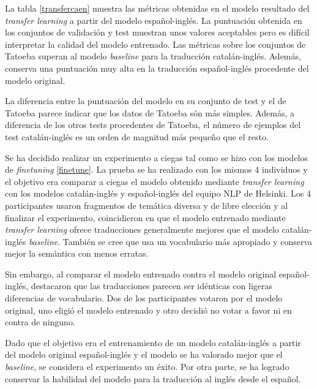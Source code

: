 La tabla \ref{transfercaen} muestra las métricas obtenidas en el modelo resultado del \textit{transfer learning} a partir del modelo español-inglés. La puntuación obtenida en los conjuntos de validación y test muestran unos valores aceptables pero es difícil interpretar la calidad del modelo entrenado. Las métricas sobre los conjuntos de Tatoeba superan al modelo \textit{baseline} para la traducción catalán-inglés. Además, conserva una puntuación muy alta en la traducción español-inglés procedente del modelo original.

La diferencia entre la puntuación del modelo en su conjunto de test y el de Tatoeba parece indicar que los datos de Tatoeba són más simples. Además, a diferencia de los otros tests procedentes de Tatoeba, el número de ejemplos del test catalán-inglés es un orden de magnitud más pequeño que el resto.

Se ha decidido realizar un experimento a ciegas tal como se hizo con los modelos de \textit{finetuning} \ref{finetune}. La prueba se ha realizado con los mismos 4 individuos y el objetivo era comparar a ciegas el modelo obtenido mediante \textit{transfer learning} con los modelos catalán-inglés y español-inglés del equipo NLP de Helsinki. Los 4 participantes usaron fragmentos de temática diversa y de libre elección y al finalizar el experimento, coincidieron en que el modelo entrenado mediante \textit{transfer learning} ofrece traducciones generalmente mejores que el modelo catalán-inglés \textit{baseline}. También se cree que usa un vocabulario más apropiado y conserva mejor la semántica con menos erratas.

Sin embargo, al comparar el modelo entrenado contra el modelo original español-inglés, destacaron que las traducciones parecen ser idénticas con ligeras diferencias de vocabulario. Dos de los participantes votaron por el modelo original, uno eligió el modelo entrenado y otro decidió no votar a favor ni en contra de ninguno.

Dado que el objetivo era el entrenamiento de un modelo catalán-inglés a partir del modelo original español-inglés y el modelo se ha valorado mejor que el \textit{baseline}, se considera el experimento un éxito. Por otra parte, se ha logrado conservar la habilidad del modelo para la traducción al inglés desde el español.

